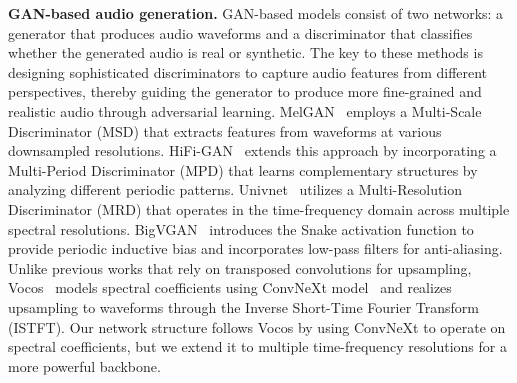 \noindent\textbf{GAN-based audio generation.} GAN-based models consist of two networks: a generator that produces audio waveforms and a discriminator that classifies whether the generated audio is real or synthetic. The key to these methods is designing sophisticated discriminators to capture audio features from different perspectives, thereby guiding the generator to produce more fine-grained and realistic audio through adversarial learning. 
MelGAN~\citep{melgan} employs a Multi-Scale Discriminator (MSD) that extracts features from waveforms at various downsampled resolutions. HiFi-GAN~\citep{hifigan} extends this approach by incorporating a Multi-Period Discriminator (MPD) that learns complementary structures by analyzing different periodic patterns. Univnet~\citep{mrd} utilizes a Multi-Resolution Discriminator (MRD) that operates in the time-frequency domain across multiple spectral resolutions. BigVGAN~\citep{bigvgan} introduces the Snake activation function to provide periodic inductive bias and incorporates low-pass filters for anti-aliasing. Unlike previous works that rely on transposed convolutions for upsampling, Vocos~\citep{vocos} models spectral coefficients using ConvNeXt model~\citep{convnext} and realizes upsampling to waveforms through the Inverse Short-Time Fourier Transform (ISTFT). Our network structure follows Vocos by using ConvNeXt to operate on spectral coefficients, but we extend it to multiple time-frequency resolutions for a more powerful backbone.

